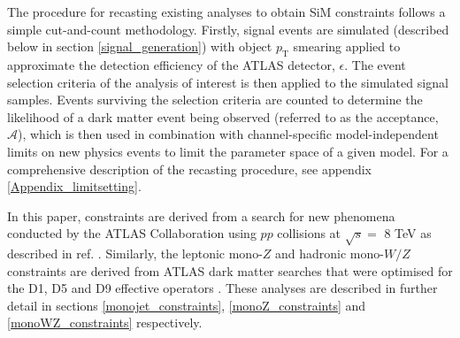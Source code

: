 The procedure for recasting existing \monoX analyses to obtain SiM constraints follows a simple cut-and-count methodology. Firstly, signal events are simulated (described below in section \ref{signal_generation}) with object $p_{\mathrm{T}}$ smearing applied to approximate the detection efficiency of the ATLAS detector, $\epsilon$. The event selection criteria of the \monoX analysis of interest is then applied to the simulated signal samples. Events surviving the selection criteria are counted to determine the likelihood of a dark matter event being observed (referred to as the acceptance, $\mathcal{A}$), which is then used in combination with channel-specific model-independent limits on new physics events to limit the parameter space of a given model.
For a comprehensive description of the recasting procedure, see appendix \ref{Appendix_limitsetting}.

In this paper, \monojet constraints are derived from a search for new phenomena conducted by the ATLAS Collaboration using $pp$ collisions at $\sqrt{s}=$ 8 TeV as described in ref. \cite{Aad:2015zva}. Similarly, the leptonic mono-$Z$ and hadronic mono-$W/Z$ constraints are derived from ATLAS dark matter searches that were optimised for the D1, D5 and D9 effective operators \cite{Aad:2014monoZlep,Aad:2013monoWZ}. These analyses are described in further detail in sections \ref{monojet_constraints}, \ref{monoZ_constraints} and \ref{monoWZ_constraints} respectively.


